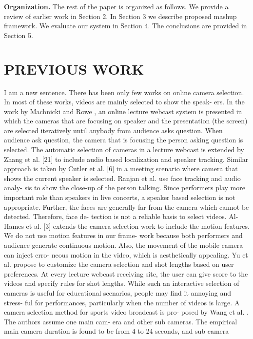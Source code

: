 \documentclass{sig-alternate}
\begin{document}
\textbf{Organization.} The rest of the paper is organized as follows.
We provide a review of earlier work in Section 2. In Section 3 we
describe proposed mashup framework. We evaluate our system in
Section 4. The conclusions are provided in Section 5.


\section{PREVIOUS WORK}
I am a new sentence.
There has been only few works on online camera selection. In
most of these works, videos are mainly selected to show the speak-
ers. In the work by Machnicki and Rowe \cite{salas:nine}, an online lecture
webcast system is presented in which the cameras that are focusing
on speaker and the presentation (the screen) are selected iteratively
until anybody from audience asks question. When audience ask
question, the camera that is focusing the person asking question is
selected. The automatic selection of cameras in a lecture webcast
is extended by Zhang et al. [21] to include audio based localization
and speaker tracking. Similar approach is taken by Cutler et al. [6]
in a meeting scenario where camera that shows the current speaker
is selected. Ranjan et al. \cite{salas:twelve} use face tracking and audio analy-
sis to show the close-up of the person talking. Since performers
play more important role than speakers in live concerts, a speaker
based selection is not appropriate. Further, the faces are generally
far from the camera which cannot be detected. Therefore, face de-
tection is not a reliable basis to select videos.
Al-Hames et al. [3] extends the camera selection work to include
the motion features. We do not use motion features in our frame-
work because both performers and audience generate continuous
motion. Also, the movement of the mobile camera can inject erro-
neous motion in the video, which is aesthetically appealing. Yu et
al. \cite{salas:twenty} propose to customize the camera selection and shot lengths
based on user preferences. At every lecture webcast receiving site,
the user can give score to the videos and specify rules for shot
lengths. While such an interactive selection of cameras is useful
for educational scenarios, people may find it annoying and stress-
ful for performances, particularly when the number of videos is
large.
A camera selection method for sports video broadcast is pro-
posed by Wang et al. \cite{salas:sixteen}. The authors assume one main cam-
era and other sub cameras. The empirical main camera duration is
found to be from 4 to 24 seconds, and sub camera
\end{document}
